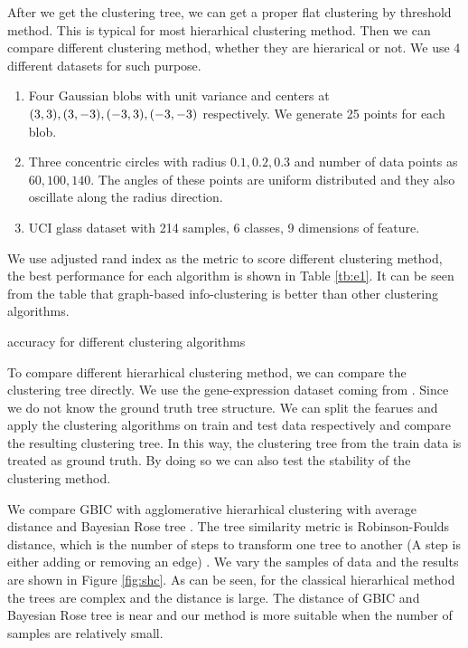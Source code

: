 After we get the clustering tree, we can get a proper flat clustering by threshold method. This is typical for most hierarhical clustering method. Then we can compare different clustering method, whether they are hierarical or not. We use 4 different datasets for such purpose.
\begin{enumerate}
\item Four Gaussian blobs with unit variance and centers at $(3,3), (3,-3), (-3,3),  \linebreak[4](-3,-3)$ respectively.  We generate 25 points for each blob.
\item Three concentric circles with radius $0.1,0.2,0.3$ and number of data points as $60, 100, 140$. The angles of these points are uniform distributed and they also oscillate along the radius direction.
\item UCI glass dataset with 214 samples, 6 classes, 9 dimensions of feature.
\end{enumerate}
We use adjusted rand index as the metric to score different clustering method, the best performance for each algorithm is shown in Table \ref{tb:e1}.  It can be seen from the table that graph-based info-clustering is better than other clustering algorithms.
\begin{table}[!ht]
\centering
{}
\caption{ accuracy for different clustering algorithms }\label{tb:e1}
\end{table}
To compare different hierarhical clustering method, we can compare the clustering tree directly. We use the gene-expression dataset coming from \cite{khan2001classification}.
Since we do not know the ground truth tree structure. We can split the fearues and apply the clustering algorithms on train and test data respectively and compare the resulting
clustering tree. In this way, the clustering tree from the train data is treated as ground truth. By doing so we can also test the stability of the clustering method.

We compare GBIC with agglomerative hierarhical clustering with average distance and Bayesian Rose tree \citep{blundell2011discovering}. The tree similarity metric is Robinson-Foulds distance, which is the number of steps to transform one tree to another (A step is either adding or removing an edge) \citep{day1985optimal}. We vary the samples of data and the results are shown in Figure \ref{fig:shc}. As can be seen, for the classical hierarhical method the trees are complex and the distance is large. The distance of GBIC and Bayesian Rose tree is near and our method is more suitable when the number of samples are relatively small.

